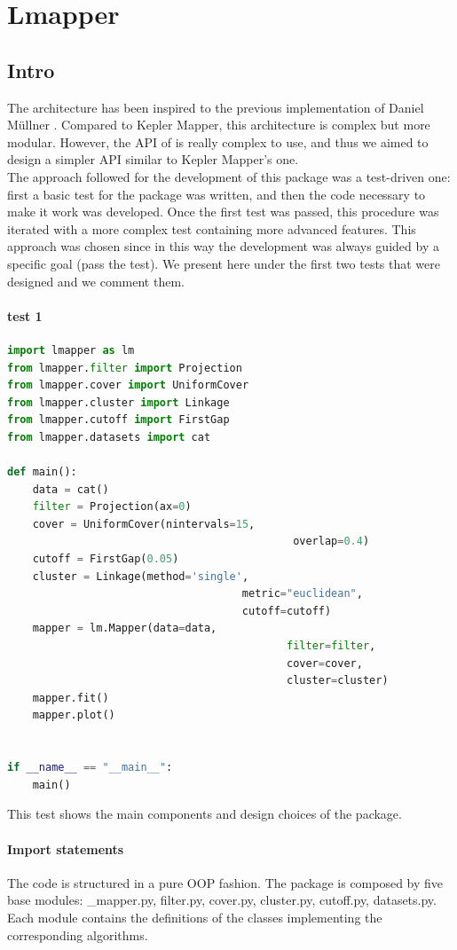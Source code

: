 \section{Lmapper}
\subsection{Intro}
The architecture has been inspired to the previous implementation of Daniel M\"ullner \cite{pythonmapper}. Compared to Kepler Mapper, this architecture is complex but more modular. However, the API of \cite{pythonmapper} is really complex to use, and thus we aimed to design a simpler API similar to Kepler Mapper's one.\\
The approach followed for the development of this package was a test-driven one: first a basic test for the package was written, and then the code necessary to make it work was developed. Once the first test was passed, this procedure was iterated with a more complex test containing more advanced features. This approach was chosen since in this way the development was always guided by a specific goal (pass the test).
We present here under the first two tests that were designed and we comment them.

\paragraph{test 1}
\begin{lstlisting}[language=Python, caption=First test for Mapper]
import lmapper as lm
from lmapper.filter import Projection
from lmapper.cover import UniformCover
from lmapper.cluster import Linkage
from lmapper.cutoff import FirstGap
from lmapper.datasets import cat

def main():
    data = cat()
	filter = Projection(ax=0)
	cover = UniformCover(nintervals=15,
										     overlap=0.4)
	cutoff = FirstGap(0.05)
	cluster = Linkage(method='single',
									 metric="euclidean",
									 cutoff=cutoff)
	mapper = lm.Mapper(data=data,
											filter=filter,
	 										cover=cover,
											cluster=cluster)
	mapper.fit()
	mapper.plot()


if __name__ == "__main__":
	main()

\end{lstlisting}
This test shows the main components and design choices of the package. 
\paragraph{Import statements}
The code is structured in a pure OOP fashion. The package is composed by five base modules: \_mapper.py, filter.py, cover.py, cluster.py, cutoff.py, datasets.py.  Each module contains the definitions of the classes implementing the corresponding algorithms. 
